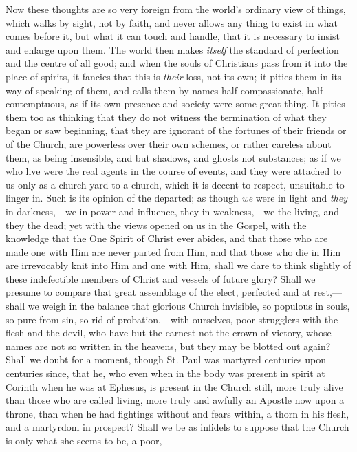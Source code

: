 Now these thoughts are so very foreign from the world's ordinary
view of things, which walks by sight, not by faith, and never allows
any thing to exist in what comes before it, but what it can touch and
handle, that it is necessary to insist and enlarge upon them. The
world then makes \emph{itself} the standard of perfection and the
centre of all good; and when the souls of Christians pass from it into
the place of spirits, it fancies that this is \emph{their} loss, not
its own; it pities them in its way of speaking of them, and calls them
by names half compassionate, half contemptuous, as if its own presence
and society were some great thing. It pities them too as thinking that
they do not witness the termination of what they began or saw
beginning, that they are ignorant of the fortunes of their friends or
of the Church, are powerless over their own schemes, or rather
careless about them, as being insensible, and but shadows, and ghosts
not substances; as if we who live were the real agents in the course
of events, and they were attached to us only as a church-yard to a
church, which it is decent to respect, unsuitable to linger in. Such
is its opinion of the departed; as though \emph{we} were in light and \emph{they}
in darkness,—we in power and influence, they in weakness,—we the
living, and they the dead; yet with the views opened on us in the
Gospel, with the knowledge that the One Spirit of Christ ever abides,
and that those who are made one with Him are never parted from Him,
and that those who die in Him are irrevocably knit into Him and one
with Him, shall we dare to think slightly of these indefectible
members of Christ and vessels of future glory? Shall we presume to
compare that great assemblage of the elect, perfected and at rest,—shall
we weigh in the balance that glorious Church invisible, so populous in
souls, so pure from sin, so rid of probation,—with ourselves, poor
strugglers with the flesh and the devil, who have but the earnest not
the crown of victory, whose names are not so written in the heavens,
but they may be blotted out again? Shall we doubt for a moment, though
St. Paul was martyred centuries upon centuries since, that he, who
even when in the body was present in spirit at Corinth when he was at
Ephesus, is present in the Church still, more truly alive than those
who are called living, more truly and awfully an Apostle now upon a
throne, than when he had fightings without and fears within, a thorn
in his flesh, and a martyrdom in prospect? Shall we be as infidels to
suppose that the Church is only what she seems to be, a poor,
